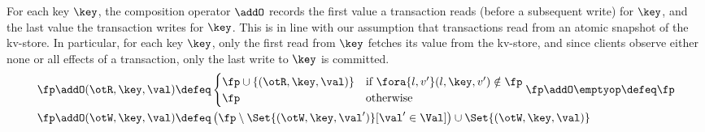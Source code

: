 For each key $\key$, the composition operator \( \addO \) records
the first value a transaction reads (before a subsequent write) for $\key$, 
and the last value the transaction writes for $\key$.
This is in line with our assumption that transactions read from an atomic snapshot of the kv-store.
In particular, for each key $\key$, 
only the first read from $\key$ fetches its value from the kv-store,
and since clients observe either none or all effects of a transaction, 
only the last write to $\key$ is committed.
%
\begin{align*}
    \fp \addO (\otR, \key, \val)  & \defeq
    \begin{cases}
        \fp \cup \{(\otR, \key, \val)\} & \text{if} \ \fora{l, v'} (l, \key, v') \notin \fp \\
        \fp &  \text{otherwise} \\
    \end{cases} 
    \fp \addO \emptyop  \defeq  \fp \\
    \fp \addO (\otW, \key, \val) & \defeq 
    \left( \fp \setminus \Set{(\otW, \key, \val')}[\val' \in \Val] \right) \cup \Set{(\otW, \key, \val)} 
\end{align*}
\]
%
\ifTechReport
    
\else
